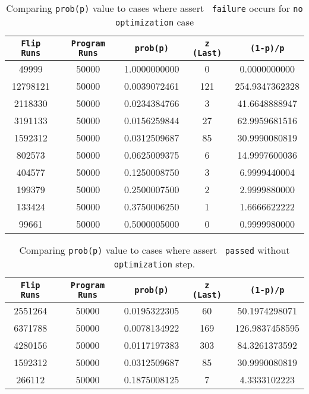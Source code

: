 \documentclass[usenames,dvipsnames,acmsmall]{acmart}
\begin{document}
	\begin{table}
		\centering
		\caption{Comparing \texttt{prob(p)} value to cases where assert \texttt{\color[HTML]{CB0000} failure} occurs for \texttt{no optimization} case}
		\label{}
		\begin{tabular}{ c | c | c | c | c } 
			\toprule
			\texttt{Flip Runs} & \texttt{Program Runs}& \texttt{prob(p)} & \texttt{z (Last)} & \texttt{(1-p)/p} \\ 
			\hline\hline
			49999 & 50000 & 1.0000000000 & 0 & 0.0000000000 \\ \hline 
			12798121 & 50000 & 0.0039072461 & 121 & 254.9347362328 \\ \hline 
			2118330 & 50000 & 0.0234384766 & 3 & 41.6648888947 \\ \hline 
			3191133 & 50000 & 0.0156259844 & 27 & 62.9959681516 \\ \hline 
			1592312 & 50000 & 0.0312509687 & 85 & 30.9990080819 \\ \hline 
			802573 & 50000 & 0.0625009375 & 6 & 14.9997600036 \\ \hline  
			404577 & 50000 & 0.1250008750 & 3 & 6.9999440004 \\ \hline 
			199379 & 50000 & 0.2500007500 & 2 & 2.9999880000 \\ \hline 
			133424 & 50000 & 0.3750006250 & 1 & 1.6666622222 \\ \hline 
			99661 & 50000 & 0.5000005000 & 0 & 0.9999980000 \\ \hline 
			\bottomrule
		\end{tabular}
	\end{table}
	\begin{table}
		\centering
		\caption{Comparing \texttt{prob(p)} value to cases where assert \texttt{\color[HTML]{036400} passed} without \texttt{optimization} step.}
		\label{}
		\begin{tabular}{ c | c | c | c | c } 
			\toprule
			\texttt{Flip Runs} & \texttt{Program Runs}& \texttt{prob(p)} & \texttt{z (Last)} & \texttt{(1-p)/p} \\ 
			\hline\hline
			2551264 & 50000 & 0.0195322305 & 60 & 50.1974298071 \\ \hline 
			6371788 & 50000 & 0.0078134922 & 169 & 126.9837458595 \\ \hline 
			4280156 & 50000 & 0.0117197383 & 303 & 84.3261373592 \\ \hline 
			1592312 & 50000 & 0.0312509687 & 85 & 30.9990080819 \\ \hline
			266112 & 50000 & 0.1875008125 & 7 & 4.3333102223 \\ \hline 
			\bottomrule
		\end{tabular}
	\end{table}
\end{document}
